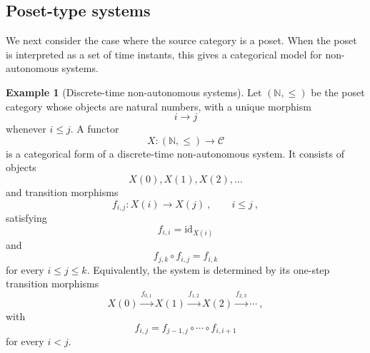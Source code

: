 \documentclass[a4paper,reqno,oneside]{amsart}
\theoremstyle{definition}
\newtheorem{example}[theorem]{Example}
\theoremstyle{remark}
\newcommand{\N}{\mathbb{N}}
\newcommand{\id}{\mathrm{id}}
\numberwithin{equation}{section}
\begin{document}
	
	
	\subsection{Poset-type systems}\label{sec: poset type model}
	
	We next consider the case where the source category is a poset. When the poset is interpreted as a set of time instants, this gives a categorical model for non-autonomous systems.
	
	
	
	
	\begin{example}[Discrete-time non-autonomous systems]\label{ex: Non-autonomous discrete-time}
		Let $(\N,\leq)$ be the poset category whose objects are natural numbers,
		with a unique morphism
		\begin{equation}
			i\to j
		\end{equation}
		whenever $i\leq j$. A functor
		\begin{equation}
			X\colon (\N,\leq)\to\mathcal C
		\end{equation}
		is a categorical form of a discrete-time non-autonomous system. It consists
		of objects
		\begin{equation}
			X(0),X(1),X(2),\ldots
		\end{equation}
		and transition morphisms
		\begin{equation}
			f_{i,j}\colon X(i)\longrightarrow X(j) \ ,
			\qquad i\leq j \ ,
		\end{equation}
		satisfying
		\begin{equation}
			f_{i,i}=\id_{X(i)}
		\end{equation}
		and
		\begin{equation}
			f_{j,k}\circ f_{i,j}=f_{i,k}
		\end{equation}
		for every $i\leq j\leq k$. Equivalently, the system is determined by its
		one-step transition morphisms
		\begin{equation}
			X(0)\xrightarrow{f_{0,1}}X(1)\xrightarrow{f_{1,2}}X(2)
			\xrightarrow{f_{2,3}}\cdots \ ,
		\end{equation}
		with
		\begin{equation}
			f_{i,j}=f_{j-1,j}\circ\cdots\circ f_{i,i+1}
		\end{equation}
		for every $i<j$.
	\end{example}
	
\end{document}
